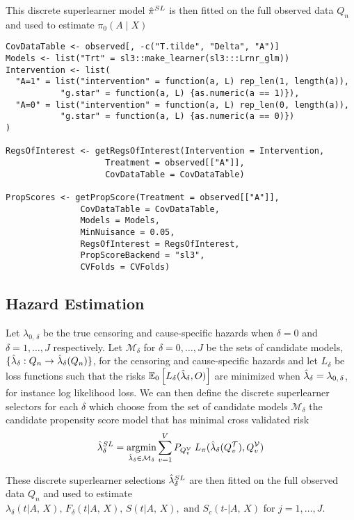 \documentclass{report}
\newcommand{\1}{\ensuremath{\mathbf{1}}}
\DeclareMathOperator*{\argmin}{argmin}
\newcommand{\X}{\ensuremath{{X}}}
\newcommand{\AX}{\ensuremath{\mid A,\,{X}}}
\newcommand{\g}{\ensuremath{\pi}}
\begin{document}
This discrete superlearner model \(\Hat{\g}^{SL}\) is then fitted on the full observed data \(Q_n\) and used to estimate \(\g_0(A \mid \X)\)

\begin{lstlisting}
CovDataTable <- observed[, -c("T.tilde", "Delta", "A")]
Models <- list("Trt" = sl3::make_learner(sl3:::Lrnr_glm))
Intervention <- list(
  "A=1" = list("intervention" = function(a, L) rep_len(1, length(a)),
	       "g.star" = function(a, L) {as.numeric(a == 1)}),
  "A=0" = list("intervention" = function(a, L) rep_len(0, length(a)),
	       "g.star" = function(a, L) {as.numeric(a == 0)})
)

RegsOfInterest <- getRegsOfInterest(Intervention = Intervention,
				    Treatment = observed[["A"]],
				    CovDataTable = CovDataTable)

PropScores <- getPropScore(Treatment = observed[["A"]],
			   CovDataTable = CovDataTable,
			   Models = Models,
			   MinNuisance = 0.05,
			   RegsOfInterest = RegsOfInterest,
			   PropScoreBackend = "sl3",
			   CVFolds = CVFolds)
\end{lstlisting}

\subsection*{Hazard Estimation}
\label{sec:org1187fd1}
Let \(\lambda_{0,\,\delta}\) be the true censoring and cause-specific hazards when \(\delta = 0\) and \(\delta = 1, \dots, J\) respectively. Let \(\mathcal{M}_\delta\) for \(\delta = 0, \dots, J\) be the sets of candidate models, \(\{\Hat{\lambda}_\delta : Q_n \to \Hat{\lambda}_\delta(Q_n)\}\), for the censoring and cause-specific hazards and let \(L_\delta\) be loss functions such that the risks \(\mathbb{E}_0\left[L_\delta(\Hat{\lambda}_\delta, O)\right]\) are minimized when \(\Hat{\lambda}_\delta = \lambda_{0,\,\delta}\), for instance log likelihood loss. We can then define the discrete superlearner selectors for each \(\delta\) which choose from the set of candidate models \(\mathcal{M_\delta}\) the candidate propensity score model that has minimal cross validated risk 
\[ \Hat{\lambda}_\delta^{SL} = \argmin_{\Hat{\lambda}_\delta \in \mathcal{M}_\delta} \sum_{v = 1}^{V} P_{Q^\mathcal{V}_v} \; L_\g(\Hat{\lambda}_\delta(Q^\mathcal{T}_v), Q^\mathcal{V}_v)\]

These discrete superlearner selections \(\Hat{\lambda}_\delta^{SL}\) are then fitted on the full observed data \(Q_n\) and used to estimate \(\lambda_\delta(t \AX), \, F_\delta(t \AX),\, S(t \AX), \text{ and } S_c(t\text{-} \AX)\) for \(j = 1,\dots, J\).
\end{document}
